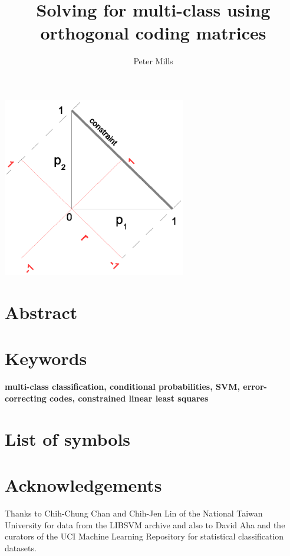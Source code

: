 \documentclass{article}
\title{Solving for multi-class using orthogonal coding matrices}
\author{Peter Mills}
\begin{document}
\maketitle

\begin{center}
	\includegraphics[width=0.6\textwidth]{../multi2/binary_class_map}
\end{center}

\section*{Abstract}



\section*{Keywords}
\textbf{multi-class classification, 
	conditional probabilities,
	SVM,
	error-correcting codes,
	constrained linear least squares}

\tableofcontents

\section*{List of symbols}





\appendix

\section*{Acknowledgements}

Thanks to Chih-Chung Chan and Chih-Jen Lin of the National Taiwan University
for data from the LIBSVM archive and also to David Aha and the curators of
the UCI Machine Learning Repository for statistical classification datasets.

\newpage
{}

\end{document}
